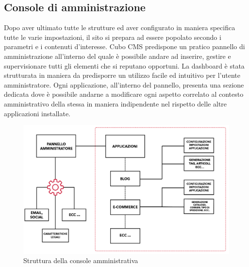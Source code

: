 \clearpage

\subsection{Console di amministrazione}
Dopo aver ultimato tutte le strutture ed aver configurato in maniera specifica tutte le varie impostazioni, il sito si prepara ad essere popolato secondo i parametri e i contenuti d'interesse. Cubo CMS predispone un pratico pannello di amministrazione all'interno del quale è possibile andare ad inserire, gestire e supervisionare tutti gli elementi che si reputano opportuni. La dashboard è stata strutturata in maniera da predisporre un utilizzo facile ed intuitivo per l'utente amministratore. Ogni applicazione, all'interno del pannello, presenta una sezione dedicata dove è possibile andarne a modificare ogni aspetto correlato al contesto amministrativo della stessa in maniera indipendente nel rispetto delle altre applicazioni installate.

\begin{figure}[ht!]
    \centering
    \includegraphics[width=140mm]{images/Struttura Console amministrazione.png}
    \caption{Struttura della console amministrativa\label{overflow}}
\end{figure}

